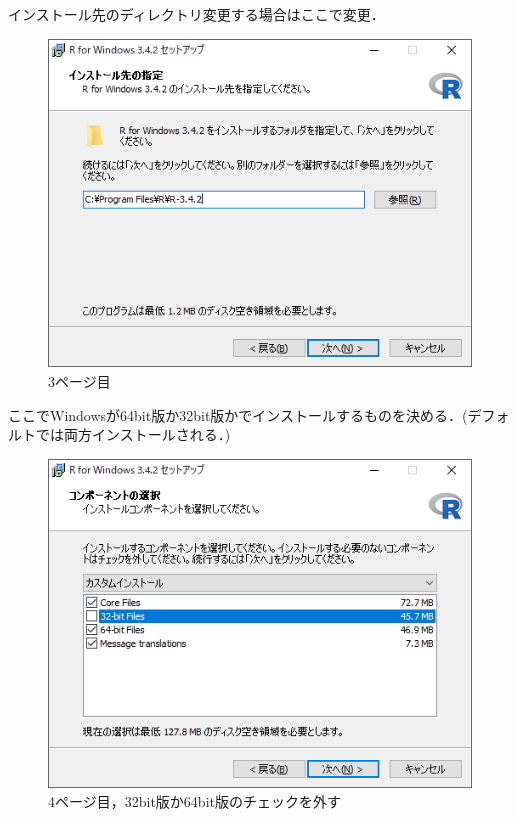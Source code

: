 \newpage

インストール先のディレクトリ変更する場合はここで変更．
\begin{figure}[!htbp]
\centering 
\includegraphics[width=13cm]{rinstall3.png}
\caption{3ページ目}
\end{figure}

\newpage

ここでWindowsが64bit版か32bit版かでインストールするものを決める．(デフォルトでは両方インストールされる．)

\begin{figure}[!htbp]
\centering 
\includegraphics[width=13cm]{rinstall4.png}
\caption{4ページ目，32bit版か64bit版のチェックを外す}
\end{figure}


